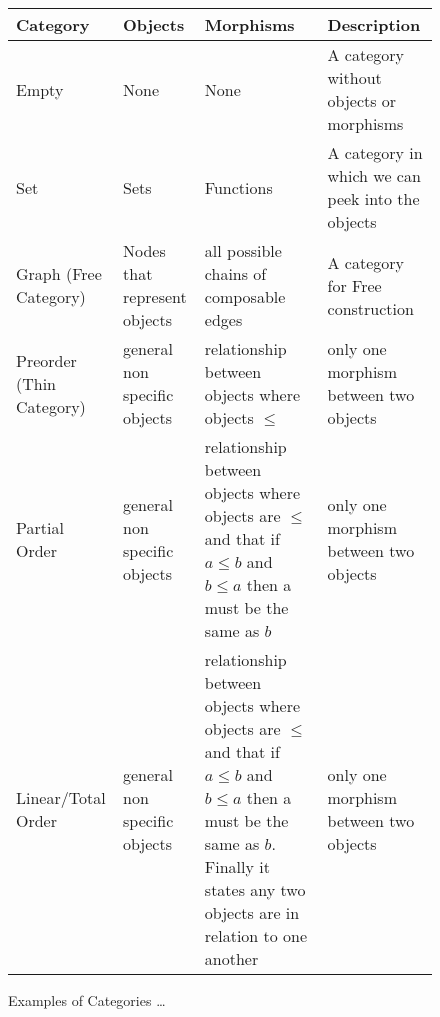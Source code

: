 \begin{figure}[htp]
    \caption{Examples of Categories \ldots}
    \begin{tabularx}{0.9\textwidth} {
            | >{\centering\arraybackslash}X
            | >{\centering\arraybackslash}X
            | >{\centering\arraybackslash}X
            | >{\centering\arraybackslash}X |}
        \hline
        Category                 & Objects                      & Morphisms                                                                                                                                                                                                & Description                                      \\
        \hline
        Empty                    & None                         & None                                                                                                                                                                                                     & A category without objects or morphisms          \\
        \hline
        Set                      & Sets                         & Functions                                                                                                                                                                                                & A category in which we can peek into the objects \\
        \hline
        Graph (Free Category)    & Nodes that represent objects & all possible chains of composable edges                                                                                                                                                                  & A category for Free construction                 \\
        \hline
        Preorder (Thin Category) & general non specific objects & relationship between objects where objects $\leq$                                                                                                                                        & only one morphism between two objects            \\
        \hline
        Partial Order            & general non specific objects & relationship between objects where objects are $\leq$ and that if $a \leq b$ and $b \leq a$ then a must be the same as $b$                                                                   & only one morphism between two objects            \\
        \hline
        Linear/Total Order       & general non specific objects & relationship between objects where objects are $\leq$ and that if $a \leq b$ and $b \leq a$ then a must be the same as $b$. Finally it states any two objects are in relation to one another & only one morphism between two objects            \\
        \hline
    \end{tabularx}
\end{figure}